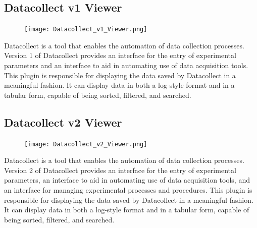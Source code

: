 \documentclass[10pt]{article}
\begin{document}
\endgroup

\clearpage
\begingroup
\setlength\intextsep{0pt}
\subsection{Datacollect v1 Viewer}
\begin{figure}
		\texttt{[image: Datacollect\_v1\_Viewer.png]}
\end{figure}
Datacollect is a tool that enables the automation of data collection processes.  Version 1 of Datacollect provides an interface for the entry of experimental parameters and an interface to aid in automating use of data acquisition tools.  This plugin is responsible for displaying the data saved by Datacollect in a meaningful fashion.  It can display data in both a log-style format and in a tabular form, capable of being sorted, filtered, and searched.

\endgroup

\hfill\break
\hfill\break

\begingroup
\setlength\intextsep{0pt}
\subsection{Datacollect v2 Viewer}
\begin{figure}
		\texttt{[image: Datacollect\_v2\_Viewer.png]}
\end{figure}
Datacollect is a tool that enables the automation of data collection processes.  Version 2 of Datacollect provides an interface for the entry of experimental parameters, an interface to aid in automating use of data acquisition tools, and an interface for managing experimental processes and procedures.  This plugin is responsible for displaying the data saved by Datacollect in a meaningful fashion.  It can display data in both a log-style format and in a tabular form, capable of being sorted, filtered, and searched.

\endgroup

\hfill \break
\hfill \break
\hfill \break
\hfill \break
\hfill \break
\hfill \break
\hfill \break
\hfill \break
\hfill \break

\begingroup
\setlength\intextsep{0pt}
\end{document}
